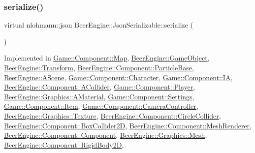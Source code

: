 \subsubsection{\texorpdfstring{serialize()}{serialize()}}
{\footnotesize\ttfamily virtual nlohmann\+::json Beer\+Engine\+::\+Json\+Serializable\+::serialize (\begin{DoxyParamCaption}{ }\end{DoxyParamCaption})\hspace{0.3cm}{\ttfamily [pure virtual]}}



Implemented in \mbox{\hyperlink{class_game_1_1_component_1_1_map_a220f971266cc2b3c5f7b6a10639ec8e6}{Game\+::\+Component\+::\+Map}}, \mbox{\hyperlink{class_beer_engine_1_1_game_object_a4b1436f051194c385b9a82ad8fbb0c5b}{Beer\+Engine\+::\+Game\+Object}}, \mbox{\hyperlink{class_beer_engine_1_1_transform_aafa05f7ad8f420d5aa35671fd1f65d37}{Beer\+Engine\+::\+Transform}}, \mbox{\hyperlink{class_beer_engine_1_1_component_1_1_particle_base_ac4ab484a5ef468cbb69cccdf39e6d9a8}{Beer\+Engine\+::\+Component\+::\+Particle\+Base}}, \mbox{\hyperlink{class_beer_engine_1_1_a_scene_ae876ec81592c80e7346f05c56bdaa929}{Beer\+Engine\+::\+A\+Scene}}, \mbox{\hyperlink{class_game_1_1_component_1_1_character_a4f77e3bf02c40339350f47626d57dad8}{Game\+::\+Component\+::\+Character}}, \mbox{\hyperlink{class_game_1_1_component_1_1_i_a_a3d5af6c25e457a246fac8cbd63764223}{Game\+::\+Component\+::\+IA}}, \mbox{\hyperlink{class_beer_engine_1_1_component_1_1_a_collider_aecc5eb364d52beede07428ba1b668e09}{Beer\+Engine\+::\+Component\+::\+A\+Collider}}, \mbox{\hyperlink{class_game_1_1_component_1_1_player_a164f1424c0ff3d603ee60301e0aee6a7}{Game\+::\+Component\+::\+Player}}, \mbox{\hyperlink{class_beer_engine_1_1_graphics_1_1_a_material_aaf0626af4ae3a8e004dfd3f1a23bd7c4}{Beer\+Engine\+::\+Graphics\+::\+A\+Material}}, \mbox{\hyperlink{class_game_1_1_component_1_1_settings_a1e378dbe2c0c7a198eae234e5979e91f}{Game\+::\+Component\+::\+Settings}}, \mbox{\hyperlink{class_game_1_1_component_1_1_item_a8aae88fd10b852e81fbaa16b5912a4ab}{Game\+::\+Component\+::\+Item}}, \mbox{\hyperlink{class_game_1_1_component_1_1_camera_controller_a1a7f36bf3f1f25b0edd404146f0c3289}{Game\+::\+Component\+::\+Camera\+Controller}}, \mbox{\hyperlink{class_beer_engine_1_1_graphics_1_1_texture_acb81c7ded6c7be42b0e901dd57dc8785}{Beer\+Engine\+::\+Graphics\+::\+Texture}}, \mbox{\hyperlink{class_beer_engine_1_1_component_1_1_circle_collider_a9898927635bb575aa2895cc5516433fc}{Beer\+Engine\+::\+Component\+::\+Circle\+Collider}}, \mbox{\hyperlink{class_beer_engine_1_1_component_1_1_box_collider2_d_a9172319becb9c609206265378ad04724}{Beer\+Engine\+::\+Component\+::\+Box\+Collider2D}}, \mbox{\hyperlink{class_beer_engine_1_1_component_1_1_mesh_renderer_a65c6c22ae40b5b94f590c3a8bf14d0d0}{Beer\+Engine\+::\+Component\+::\+Mesh\+Renderer}}, \mbox{\hyperlink{class_beer_engine_1_1_component_1_1_component_a4d82d8a6b22b93514e0585fa4073041f}{Beer\+Engine\+::\+Component\+::\+Component}}, \mbox{\hyperlink{class_beer_engine_1_1_graphics_1_1_mesh_a2bdd2912e84c9e2d686bdad2dbf6ec9e}{Beer\+Engine\+::\+Graphics\+::\+Mesh}}, \mbox{\hyperlink{class_beer_engine_1_1_component_1_1_rigid_body2_d_afd6b6d4073e564a1c536243027bb8597}{Beer\+Engine\+::\+Component\+::\+Rigid\+Body2D}}, 